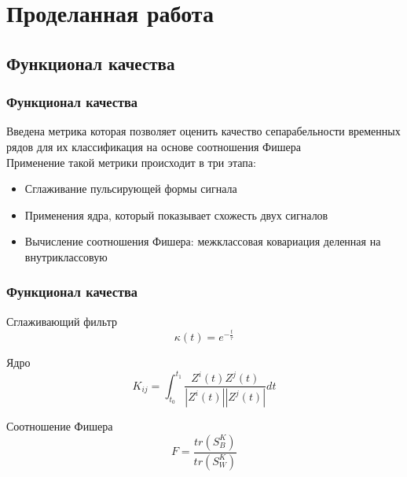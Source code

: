 \documentclass{beamer}
\begin{document}
\section{Проделанная работа}
\frame{\tableofcontents[currentsection]}
\subsection{Функционал качества}

\begin{frame}
\frametitle{Функционал качества}
Введена метрика которая позволяет оценить качество сепарабельности временных рядов для их классификация на основе соотношения Фишера\\
Применение такой метрики происходит в три этапа:

\begin{itemize}
\item Сглаживание пульсирующей формы сигнала
\item Применения ядра, который показывает схожесть двух сигналов
\item Вычисление соотношения Фишера: межклассовая ковариация деленная на внутриклассовую
\end{itemize}

\end{frame}

\begin{frame}
\frametitle{Функционал качества}
\begin{block}{Сглаживающий фильтр}
	\begin{equation}
		\kappa(t)=e^{-\frac{t}{\tau}}
	\end{equation}
\end{block}

\begin{block}{Ядро}
	\begin{equation}
		K_{ij} = \int_{t_{0}}^{t_{1}} \frac{Z^{i}(t)Z^{j}(t)}{|Z^i(t)||Z^j(t)|}dt
	\end{equation}
\end{block}
\begin{block}{Соотношение Фишера}
	\begin{equation}
		F=\frac{tr(S_{B}^{K})}{tr(S_{W}^{K})}
	\end{equation}
\end{block}

\end{frame}
\end{document}
